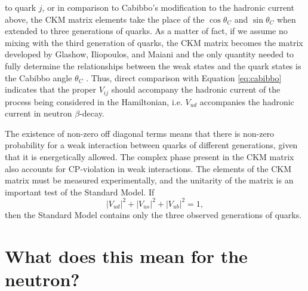 to quark $j$, or in comparison to Cabibbo's modification to the hadronic current
above, the CKM matrix elements take the place of the $\cos\theta_C$ and $\sin\theta_C$
when extended to three generations of quarks. As a matter of fact, if we assume no mixing
with the third generation of quarks, the CKM matrix becomes the matrix developed by
Glashow, Iliopoulos, and Maiani and the only quantity needed to fully determine
the relationships between the weak states and the quark states is the Cabibbo angle $\theta_C$
\cite{griffiths2008}.
Thus, direct comparison with Equation \ref{eq:cabibbo} indicates that the proper
$V_{ij}$ should accompany the hadronic current
of the process being considered in the Hamiltonian, i.e. $V_{ud}$ accompanies the hadronic
current in neutron $\beta$-decay.

The existence of non-zero off diagonal terms means that there is non-zero probability for a
weak interaction between quarks of different generations, given that it is energetically
allowed. The complex phase present in the CKM
matrix also accounts for CP-violation in weak interactions.
The elements of the CKM matrix must be measured experimentally, and the unitarity of the matrix
is an important test of the Standard Model. If
%
\begin{equation}
  |V_{ud}|^2 + |V_{us}|^2 + |V_{ub}|^2 = 1,
\end{equation}
then the Standard Model contains only the three observed generations of quarks.


\section{What does this mean for the neutron?}

